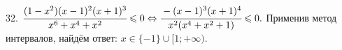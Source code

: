 32. $\cfrac{(1-x^2)(x-1)^2(x+1)^3}{x^6+x^4+x^2}\leqslant0\Leftrightarrow\cfrac{-(x-1)^3(x+1)^4}{x^2(x^4+x^2+1)}\leqslant0.$ Применив метод интервалов, найдём ответ: $x\in\{-1\}\cup[1;+\infty).$
\begin{figure}[ht!]
\end{figure}\\

